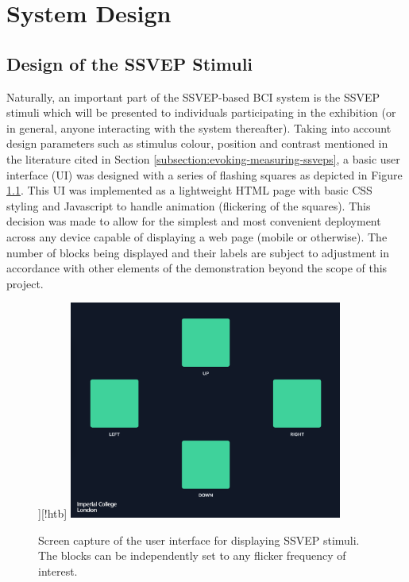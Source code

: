 \chapter{System Design}
\label{chapter:system-design}

\graphicspath{ {report/C5 System Design/assets/} } 

\section{Design of the SSVEP Stimuli}

Naturally, an important part of the SSVEP-based BCI system is the SSVEP stimuli which will be presented to individuals participating in the exhibition (or in general, anyone interacting with the system thereafter). Taking into account design parameters such as stimulus colour, position and contrast mentioned in the literature cited in Section \ref{subsection:evoking-measuring-ssveps}, a basic user interface (UI) was designed with a series of flashing squares as depicted in Figure \ref{fig:ssvep-squares-c5}. This UI was implemented as a lightweight HTML page with basic CSS styling and Javascript to handle animation (flickering of the squares). This decision was made to allow for the simplest and most convenient deployment across any device capable of displaying a web page (mobile or otherwise). The number of blocks being displayed and their labels are subject to adjustment in accordance with other elements of the demonstration beyond the scope of this project.

\begin{figure}][!htb]
    \centering
    \includegraphics[width=0.8\textwidth]{ssvep-squares}
    \caption{Screen capture of the user interface for displaying SSVEP stimuli. The blocks can be independently set to any flicker frequency of interest.}
    \label{fig:ssvep-squares-c5}
\end{figure}

